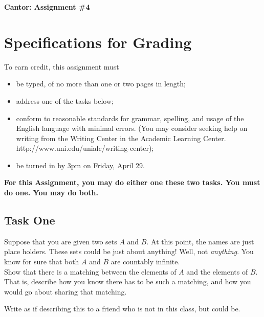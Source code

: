 \documentclass[12pt,letterpaper]{article}
\begin{document}
\setlength{\parskip}{1ex plus 0.5ex minus 0.2ex}
\setlength{\parindent}{0pt}

\pagestyle{fancy}
\lfoot{}
\rfoot{}

\begin{center}
{
\Large
\textbf{Cantor: Assignment \#4}
}
\end{center}

\section*{Specifications for Grading}

To earn credit, this assignment must
\begin{itemize}
\item be typed, of no more than one or two pages in length;
\item address one of the tasks below;
\item conform to reasonable standards for grammar, spelling, and usage of the English language with minimal errors. (You may consider seeking help on writing from the Writing Center in the Academic Learning Center. http://www.uni.edu/unialc/writing-center);
\item be turned in by 3pm on Friday, April 29.
\end{itemize}


\textbf{For this Assignment, you may do either one these two tasks. You must do one. You may do both.}


\subsection*{Task One}

Suppose that you are given two sets $A$ and $B$.
At this point, the names are just place holders. 
These sets could be just about anything!
Well, not \emph{anything}.
You know for sure that both $A$ and $B$ are countably infinite.\\

Show that there is a matching between the elements of $A$ and the elements of $B$.
That is, describe how you know there has to be such a matching, and how you would go about sharing that matching.

Write as if describing this to a friend who is not in this class, but could be.

\vfill
\end{document}
